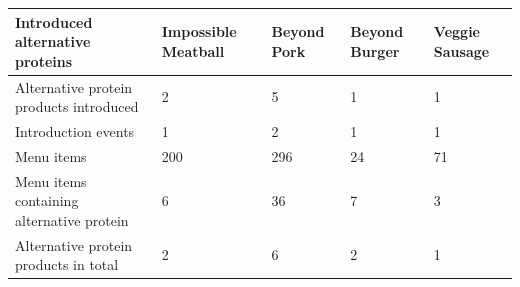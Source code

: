 \begin{longtable}{@{}V{3.0cm}V{\dimexpr(\linewidth-3.0cm-30pt)/4\relax}V{\dimexpr(\linewidth-3.0cm-30pt)/4\relax}V{\dimexpr(\linewidth-3.0cm-30pt)/4\relax}V{\dimexpr(\linewidth-3.0cm-30pt)/4\relax}@{}}
Introduced alternative proteins & Impossible Meatball & Beyond Pork & Beyond Burger & Veggie Sausage \\*
\midrule
Alternative protein products introduced & 2 & 5 & 1 & 1 \\*
Introduction events & 1 & 2 & 1 & 1 \\*
Menu items & 200 & 296 & 24 & 71 \\*
Menu items containing alternative protein & 6 & 36 & 7 & 3 \\*
Alternative protein products in total & 2 & 6 & 2 & 1 \\
\end{longtable}
\endgroup

